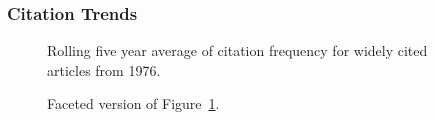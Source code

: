 \documentclass[
  10pt,
  letterpaper,
  DIV=11,
  numbers=noendperiod,
  twoside]{scrartcl}
\begin{document}
\subsubsection*{Citation Trends}\label{sec-trends-1976}

\begin{figure}


\caption{\label{fig-citation-spaghetti-1976}Rolling five year average of
citation frequency for widely cited articles from 1976.}

\end{figure}%

\begin{figure}


\caption{\label{fig-citation-facet-1976}Faceted version of
Figure~\ref{fig-citation-spaghetti-1976}.}

\end{figure}%
\end{document}
